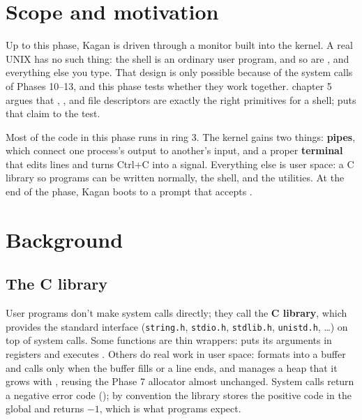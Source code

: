 \documentclass[11pt,a4paper]{article}
\begin{document}


\section{Scope and motivation}

Up to this phase, Kagan is driven through a monitor built into the kernel. A real UNIX has no such thing: the
shell is an ordinary user program, and so are ,  and everything else you type. That design is only
possible because of the system calls of Phases 10--13, and this phase tests whether they
work together. \OSTEP chapter 5 argues that , ,  and file descriptors are
exactly the right primitives for a shell;  puts that claim to the test.

Most of the code in this phase runs in ring 3. The kernel gains two things: \textbf{pipes}, which connect one
process's output to another's input, and a proper \textbf{terminal} that edits lines and turns Ctrl+C into a signal.
Everything else is user space: a C library so programs can be written normally, the shell, and the utilities. At the end of the
phase, Kagan boots to a prompt that accepts .

\section{Background}

\subsection{The C library}

User programs don't make system calls directly; they call the \textbf{C library}, which provides the standard
interface (\texttt{string.h}, \texttt{stdio.h}, \texttt{stdlib.h}, \texttt{unistd.h}, \dots) on top of system calls.
Some functions are thin wrappers:  puts its arguments in registers and executes . Others do
real work in user space:  formats into a buffer and calls  only when the buffer fills or a
line ends, and  manages a heap that it grows with , reusing the Phase 7 allocator almost
unchanged. System calls return a negative error code (); by convention the library stores the positive
code in the global  and returns $-1$, which is what programs expect.
\end{document}
